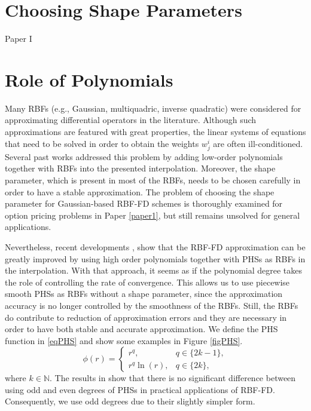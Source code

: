 \documentclass{UUThesisTemplate}
\begin{document}
\section{Choosing Shape Parameters}
Paper I
%
\section{Role of Polynomials}
Many RBFs (e.g., Gaussian, multiquadric, inverse quadratic) were considered for approximating differential operators in the literature. Although such approximations are featured with great properties, the linear systems of equations that need to be solved in order to obtain the weights $w_j^i$ are often ill-conditioned. Several past works \cite{davydov2011adaptive, fornberg2011stabilization, flyer2012guide, larsson2013stable, fornberg2013stable, flyer2016enhancing} addressed this problem by adding low-order polynomials together with RBFs into the presented interpolation. Moreover, the shape parameter, which is present in most of the RBFs, needs to be chosen carefully in order to have a stable approximation. The problem of choosing the shape parameter for Gaussian-based RBF-FD schemes is thoroughly examined for option pricing problems in Paper \ref{paper1}, but still remains unsolved for general applications.
\par
Nevertheless, recent developments \cite{bayona2017role, flyer2016on}, show that the RBF-FD approximation can be greatly improved by using high order polynomials together with PHSs as RBFs in the interpolation. With that approach, it seems as if the polynomial degree takes the role of controlling the rate of convergence. This allows us to use piecewise smooth PHSs as RBFs without a shape parameter, since the approximation accuracy is no longer controlled by the smoothness of the RBFs. Still, the RBFs do contribute to reduction of approximation errors and they are necessary in order to have both stable and accurate approximation. We define the PHS function in \eqref{eqPHS} and show some examples in Figure \ref{figPHS}.%
\begin{equation}
\label{eqPHS}
\phi(r) =  
	\begin{cases}
		r^q, & q\in\{2k-1\}, \\
		r^q \ln(r), & q\in\{2k\},
	\end{cases}
\end{equation}
where $k \in \mathbb{N}$. The results in \cite{flyer2016on} show that there is no significant difference between using odd and even degrees of PHSs in practical applications of RBF-FD. Consequently, we use odd degrees due to their slightly simpler form.%
\end{document}
